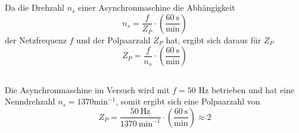 \chapter{}\label{ex:aufg4}
%
\section{}\label{sec:aufg4a}
Da die Drehzahl $n_s$ einer Asynchronmaschine die Abhängigkeit
\begin{equation}
	n_s = \frac{f}{Z_P}\cdot \left(\frac{60~\text{s}}{\text{min}}\right)
\end{equation}
der Netzfrequenz $f$ und der Polpaarzahl $Z_P$  hat, ergibt sich daraus für $Z_P$
\begin{equation}
	Z_P = \frac{f}{n_s}\cdot \left(\frac{60~\text{s}}{\text{min}}\right)
\end{equation}
%

\section{}\label{sec:aufg4b}
Die Asynchronmaschine im Versuch wird mit $f = 50$ Hz betrieben und hat eine Nenndrehzahl $n_s = 1370 \mathrm{min}^{-1}$, somit ergibt sich eine Polpaarzahl von
\begin{equation}
	Z_P = \frac{50~\text{Hz}}{1370~\text{min}^{-1}} \cdot \left(\frac{60~\text{s}}{\text{min}}\right) \approx 2
\end{equation}